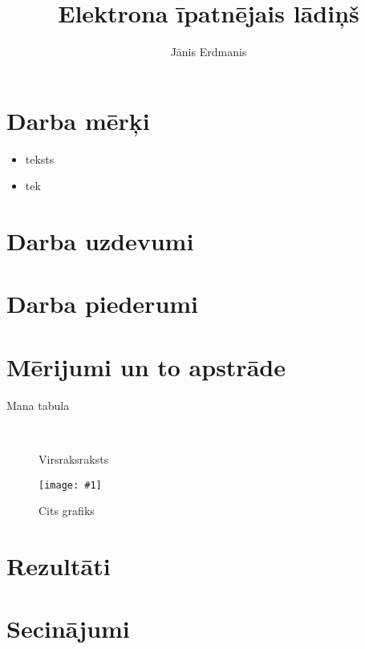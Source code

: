 \documentclass[a4paper,12pt]{article}
\author{Jānis Erdmanis}
\title{Elektrona īpatnējais lādiņš}
\newcommand{\plot}[2]{
	\begin{figure}[!ht]
		\caption{#2}
		\center
		\texttt{[image: \#1]}
	\end{figure}
}
\newcommand{\subplot}[2]{
	\subfigure[#2]{
            \texttt{[image: \#1]}
           	}%
}
\begin{document}
\maketitle

\section*{Darba mērķi}

\begin{itemize}


	
	\item teksts
	
	
	\item tek
\end{itemize}

\section*{Darba uzdevumi}

\section*{Darba piederumi}
	
\section*{Mērijumi un to apstrāde}

\begin{table}[ht!]
	\caption{Mana tabula}
	\center
	\small
\end{table}
	

	\begin{figure}[ht!] %
		\caption{Virsraksraksts}	
		\center
		
			\subplot{build/.1graf.png}{1. grafiks}
			\subplot{build/.2graf.png}{2. grafiks}\\	
	\end{figure}
	
	\plot{build/.1graf.png}{Cits grafiks}
	
\clearpage
\pagebreak

\section*{Rezultāti}

\section*{Secinājumi}
\end{document}
